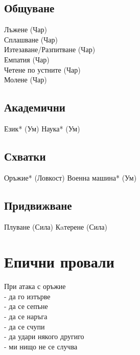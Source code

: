 \subsection{Общуване}
Лъжене (Чар)                      \\
Сплашване (Чар)                   \\
Изтезаване/Разпитване (Чар)       \\
Емпатия (Чар)                     \\
Четене по устните (Чар)           \\
Молене (Чар)                      \\

\subsection{Академични}
Език* (Ум)
Наука* (Ум)

\subsection{Схватки}
Оръжие* (Ловкост)
Военна машина* (Ум)

\subsection{Придвижване}
Плуване (Сила)
Кaтерене (Сила)

\section{Епични провали}
При атака с оръжие           \\
- да го изтърве              \\
- да се сепъне               \\
- да се наръга               \\
- да се счупи                \\
- да удари някого другиго    \\
- ми нищо не се случва       \\
